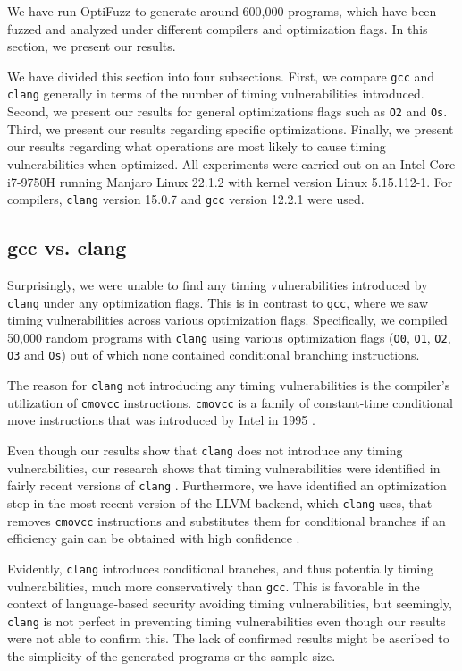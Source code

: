 We have run OptiFuzz to generate around 600,000 programs, which have been fuzzed and analyzed under different compilers and optimization flags.
In this section, we present our results.

We have divided this section into four subsections.
First, we compare \texttt{gcc} and \texttt{clang} generally in terms of the number of timing vulnerabilities introduced.
Second, we present our results for general optimizations flags such as \texttt{O2} and \texttt{Os}.
Third, we present our results regarding specific optimizations.
Finally, we present our results regarding what operations are most likely to cause timing vulnerabilities when optimized.
All experiments were carried out on an Intel Core i7-9750H running Manjaro Linux 22.1.2 with kernel version Linux 5.15.112-1. For compilers, \texttt{clang} version 15.0.7 and \texttt{gcc} version 12.2.1 were used.

\subsection{gcc vs. clang}
Surprisingly, we were unable to find any timing vulnerabilities introduced by \texttt{clang} under any optimization flags.
This is in contrast to \texttt{gcc}, where we saw timing vulnerabilities across various optimization flags.
Specifically, we compiled 50,000 random programs with \texttt{clang} using various optimization flags (\texttt{O0}, \texttt{O1}, \texttt{O2}, \texttt{O3} and \texttt{Os}) out of which none contained conditional branching instructions.

The reason for \texttt{clang} not introducing any timing vulnerabilities is the compiler's utilization of \texttt{cmovcc} instructions. 
\texttt{cmovcc} is a family of constant-time conditional move instructions \citep{cmov-is-constant-time} that was introduced by Intel in 1995 \citep{cmov-from-1995}. 

Even though our results show that \texttt{clang} does not introduce any timing vulnerabilities, our research shows that timing vulnerabilities were identified in fairly recent versions of \texttt{clang} \citep{fact,what-you-c}. 
Furthermore, we have identified an optimization step in the most recent version of the LLVM backend, which \texttt{clang} uses, that removes \texttt{cmovcc} instructions and substitutes them for conditional branches if an efficiency gain can be obtained with high confidence \citep{llvm-optimizing-away-cmov}.

Evidently, \texttt{clang} introduces conditional branches, and thus potentially timing vulnerabilities, much more conservatively than \texttt{gcc}. 
This is favorable in the context of language-based security avoiding timing vulnerabilities, but seemingly, \texttt{clang} is not perfect in preventing timing vulnerabilities even though our results were not able to confirm this. 
The lack of confirmed results might be ascribed to the simplicity of the generated programs or the sample size.

